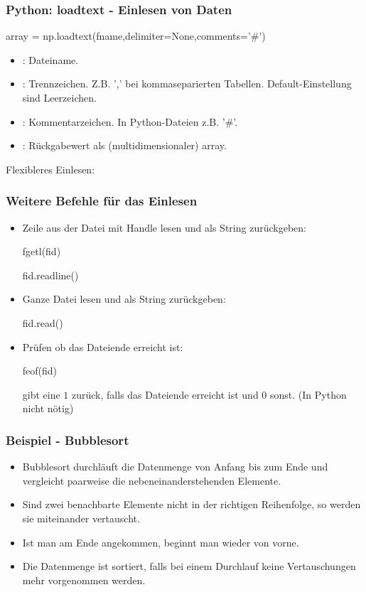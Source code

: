 \documentclass[hyperref={xetex}]{beamer}
\begin{document}
%
\begin{frame}[fragile]\frametitle{Python: loadtext - Einlesen von Daten}
\begin{pyin}
array = np.loadtext(fname,delimiter=None,comments='#')
\end{pyin}
\begin{itemize}
  \item {}: Dateiname. 
  \item {}: Trennzeichen. Z.B. ',' bei kommaseparierten Tabellen. Default-Einstellung sind Leerzeichen.
  \item {}: Kommentarzeichen. In Python-Dateien z.B. '\#'.
  \item {}: Rückgabewert als (multidimensionaler) array.
\end{itemize}
Flexibleres Einlesen: 
\end{frame}
%
%
\begin{frame}[fragile]\frametitle{Weitere Befehle für das Einlesen}
\begin{itemize}
\item Zeile aus der Datei mit  Handle  lesen und als String zurückgeben:
\begin{matlabin}
fgetl(fid) 
\end{matlabin}
  \begin{pyin}
fid.readline()
  \end{pyin}
\item Ganze Datei lesen und als String zurückgeben:
  \begin{pyin}
fid.read()
  \end{pyin}
\item Prüfen ob das Dateiende erreicht ist:
\begin{matlabin}
feof(fid)
\end{matlabin}
 gibt eine $1$
  zurück, falls das Dateiende erreicht ist und $0$ sonst. (In Python nicht nötig)
\end{itemize}
\end{frame}
%
%
\begin{frame}[fragile]\frametitle{Beispiel - Bubblesort}
\begin{itemize}
\item Bubblesort durchläuft die Datenmenge von Anfang bis zum Ende und
vergleicht paarweise die nebeneinanderstehenden Elemente. 
\item Sind zwei
benachbarte Elemente nicht in der richtigen Reihenfolge, so werden sie
miteinander vertauscht. 
\item Ist man am Ende angekommen, beginnt man wieder
von vorne. 
\item Die Datenmenge ist sortiert, falls bei einem Durchlauf
keine Vertauschungen mehr vorgenommen werden.
\end{itemize} 
\end{frame}
\end{document}
